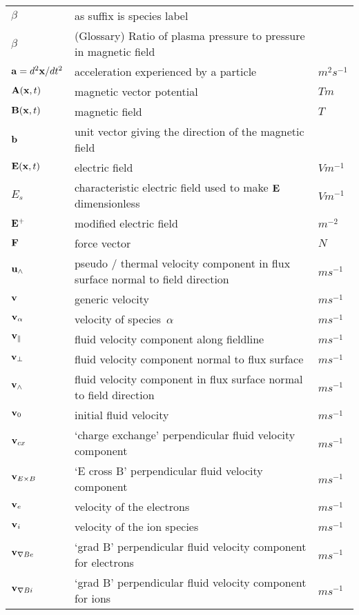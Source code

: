 \begin{longtable}{|p{3.0cm}|p{10.0cm}|p{3.0cm}|}
$\beta$ & as suffix is species label & \\
$\beta$ & (Glossary) Ratio of plasma pressure to pressure in magnetic field &  \\
${\bf a} = d^2 {\bf x}/dt^2$ & acceleration experienced by a particle  &  $m^2 s^{-1}$ \\
${\bf A}({\bf x},t)$ & magnetic vector potential   &  $T m$ \\
${\bf B}({\bf x},t)$ & magnetic field  &  $T$ \\
${\bf b}$ & unit vector giving the direction of the magnetic field & \\
${\bf E}({\bf x},t)$ & electric field  &  $V m^{-1}$ \\
$E_s$ & characteristic electric field used to make ${\bf E}$ dimensionless  &  $V m^{-1}$ \\
${\bf E}^{+}$ & modified electric field  &  $m^{-2}$ \\
${\bf F}$ & force vector  &  $N$ \\
${\bf u}_\wedge$ & pseudo / thermal velocity component in flux surface normal to field direction  &  $m s^{-1}$ \\
${\bf v}$ & generic velocity  &  $m s^{-1}$ \\
${\bf v}_\alpha$ & velocity of species~$\alpha$  &  $m s^{-1}$ \\
${\bf v}_{\|}$ & fluid velocity component along fieldline  &  $m s^{-1}$ \\
${\bf v}_\perp$ & fluid velocity component normal to flux surface  &  $m s^{-1}$ \\
${\bf v}_\wedge$ & fluid velocity component in flux surface normal to field direction  &  $m s^{-1}$ \\
${\bf v}_0$ & initial fluid velocity  &  $m s^{-1}$ \\
${\bf v}_{cx}$ & `charge exchange' perpendicular fluid velocity component  &  $m s^{-1}$ \\
${\bf v}_{E \times B}$ & `E cross B' perpendicular fluid velocity component  &  $m s^{-1}$ \\
${\bf v}_e$ & velocity of the electrons  &  $m s^{-1}$ \\
${\bf v}_i$ & velocity of the ion species  &  $m s^{-1}$ \\
${\bf v}_{\nabla B e}$ & `grad B' perpendicular fluid velocity component for electrons  &  $m s^{-1}$ \\
${\bf v}_{\nabla B i}$ & `grad B' perpendicular fluid velocity component for ions  &  $m s^{-1}$ \\

\end{longtable}
